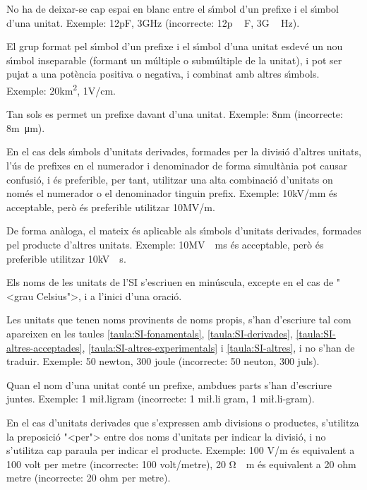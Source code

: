 No ha de deixar-se cap espai en blanc entre el s\'{\i}mbol d'un prefixe i
el s\'{\i}mbol d'una unitat. Exemple: 12\unit{pF}, 3\unit{GHz}
(incorrecte: 12\unit{p\,F}, 3\unit{G\,Hz}).

El grup format pel s\'{\i}mbol d'un prefixe i el s\'{\i}mbol d'una unitat
esdev\'{e} un nou s\'{\i}mbol inseparable (formant un m\'{u}ltiple o subm\'{u}ltiple
de la unitat), i pot ser pujat a una pot\`{e}ncia positiva o negativa, i
combinat amb altres s\'{\i}mbols. Exemple: 20\unit{km^2}, 1\unit{V/cm}.

Tan sols es permet un prefixe davant d'una unitat. Exemple:
8\unit{nm} (incorrecte: 8\unit{m\micro m}).

En el cas dels s\'{\i}mbols d'unitats derivades, formades per la divisi\'{o}
d'altres unitats, l'\'{u}s de prefixes en el numerador i denominador de
forma simult\`{a}nia pot causar confusi\'{o}, i \'{e}s preferible, per tant,
utilitzar una alta combinaci\'{o} d'unitats on nom\'{e}s el numerador o el
denominador tinguin prefix. Exemple: 10\unit{kV/mm} \'{e}s acceptable,
per\`{o} \'{e}s preferible utilitzar 10\unit{MV/m}.

De forma an\`{a}loga, el mateix \'{e}s aplicable als s\'{\i}mbols d'unitats
derivades, formades pel producte d'altres unitats.  Exemple:
10\unit{MV\cdot ms} \'{e}s acceptable, per\`{o} \'{e}s preferible utilitzar
10\unit{kV\cdot s}.

Els noms de les unitats de l'SI s'escriuen en min\'{u}scula, excepte en
el cas de {"<}grau Celsius{">}, i a l'inici d'una oraci\'{o}.

Les unitats que tenen noms provinents de noms propis, s'han
d'escriure tal com apareixen en les taules
\vref{taula:SI-fonamentals}, \vref{taula:SI-derivades}, \vref{taula:SI-altres-acceptades}, \vref{taula:SI-altres-experimentals} i \vref{taula:SI-altres}, i no s'han
de traduir. Exemple: 50 newton, 300 joule (incorrecte: 50 neuton,
300 juls).


 Quan el nom d'una unitat
cont\'{e} un prefixe, ambdues parts s'han d'escriure juntes. Exemple: 1
mi{\l.l}igram (incorrecte: 1 mi{\l.l}i gram, 1 mi{\l.l}i-gram).

En el cas  d'unitats derivades que s'expressen amb divisions o
productes, s'utilitza la preposici\'{o} {"<}per{">} entre dos noms d'unitats
per indicar la divisi\'{o}, i no s'utilitza cap paraula per indicar el
producte. Exemple: 100 \unit{V/m} \'{e}s equivalent a 100 volt per metre
(incorrecte:
 100 volt/metre), 20 \unit{\ohm\cdot m} \'{e}s equivalent a 20 ohm metre
(incorrecte: 20 ohm per metre).

